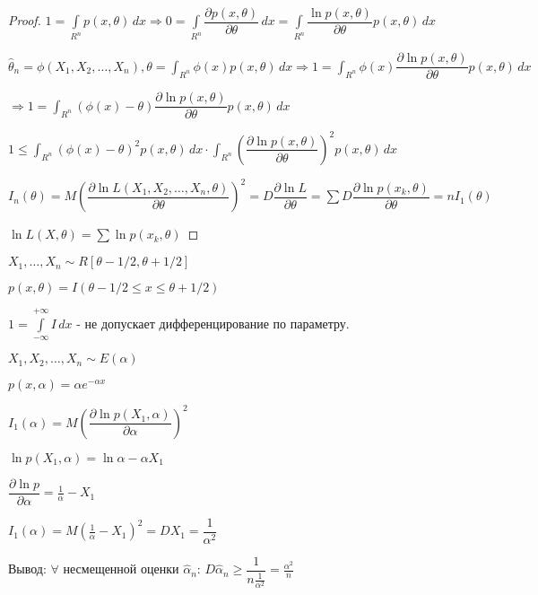 \begin{proof}
  $1 = \int\limits_{R^n} p(x, \theta) \, dx \Rightarrow 0 = \int\limits_{R^n} \dfrac{\partial p(x, \theta)}{\partial\theta} \, dx = \int\limits_{R^n} \dfrac{\ln p(x, \theta)}{\partial\theta} p(x, \theta) \, dx$

  $\hat\theta_n = \phi(X_1, X_2, \dots, X_n), \theta = \int_{R^n} \phi(x) p(x, \theta) \, dx \Rightarrow 1 = \int_{R^n} \phi(x) \dfrac{\partial \ln p(x, \theta)}{\partial\theta} p(x, \theta) \, dx$

  $\Rightarrow 1 = \int_{R^n} (\phi(x)-\theta) \dfrac{\partial \ln p(x, \theta)}{\partial \theta} p(x, \theta) \, dx$

  $1 \leqslant \int_{R^n} (\phi(x) - \theta)^2 p(x, \theta) \, dx \cdot \int_{R^n} (\dfrac{\partial\ln p(x, \theta)}{\partial\theta})^2 p(x, \theta) \, dx$

  $I_n(\theta) = M (\dfrac{\partial\ln L(X_1, X_2, \dots, X_n, \theta)}{\partial\theta})^2 = D \dfrac{\partial \ln L}{\partial\theta} = \sum D\dfrac{\partial \ln p(x_k, \theta)}{\partial\theta} = n I_1(\theta)$

  $\ln L(X, \theta) = \sum \ln p(x_k, \theta)$
\end{proof}

\begin{ex}
  $X_1, \dots, X_n \sim R[\theta-1/2, \theta+1/2]$

  $p(x, \theta) = I(\theta-1/2 \leqslant x \leqslant \theta+1/2)$

  $1 = \int\limits_{-\infty}^{+\infty} I \, dx$ - не допускает дифференцирование по параметру.
\end{ex}

\begin{ex}
  $X_1, X_2, \dots, X_n \sim E(\alpha)$

  $p(x, \alpha) = \alpha e^{-\alpha x}$

  $I_1(\alpha) = M (\dfrac{\partial\ln p(X_1, \alpha)}{\partial\alpha})^2$

  $\ln p(X_1, \alpha) = \ln \alpha - \alpha X_1$

  $\dfrac{\partial \ln p}{\partial\alpha} = \frac{1}{\alpha} - X_1$

  $I_1(\alpha) = M (\frac{1}{\alpha} - X_1)^2 = D X_1 = \dfrac{1}{\alpha^2}$
\end{ex}

Вывод: $\forall$ несмещенной оценки $\hat\alpha_n$: $D \hat\alpha_n \geqslant \dfrac{1}{n \frac{1}{\alpha^2}} = \frac{\alpha^2}{n}$ 
